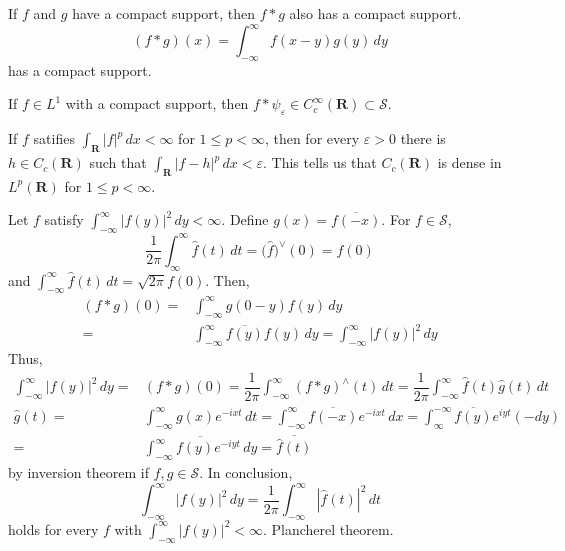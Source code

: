 \vspace{2ex}
\begin{thm}
If $f$ and $g$ have a compact support, then $f\ast g$ also has a compact support.
\[(f\ast g)(x)=\int ^{\infty }_{-\infty }f(x-y)g(y)\,dy\]
has a compact support.
\end{thm}
\vspace{2ex}
\begin{cor}
If $f\in L^{1}$ with a compact support, then $f\ast \psi _{\varepsilon }\in C_{c}^{\infty }({\bm R})\subset \mathcal{S}$. 
\end{cor}
\vspace{2ex}
\begin{recall}
If $f$ satifies $\int _{{\bm R}}|f|^{p}\,dx<\infty $ for $1\leq p<\infty $, then for every $\varepsilon >0$ there is $h\in C_{c}({\bm R})$ such that $\int _{{\bm R}}|f-h|^{p}\,dx<\varepsilon $. This tells us that $C_{c}({\bm R})$ is dense in $L^{p}({\bm R})$ for $1\leq p<\infty $. 
\end{recall}
\vspace{2ex}
\begin{ex}
Let $f$ satisfy $\int ^{\infty }_{-\infty }|f(y)|^2\,dy<\infty $. Define $g(x)=\overline{f(-x)}$. For $f\in \mathcal{S}$,
\[\dfrac{1}{2\pi }\int ^{\infty }_{\infty }\hat{f}(t)\,dt=\Big(\hat{f}\Big)^{\vee}(0)=f(0)\]
and $\int ^{\infty }_{-\infty }\hat{f}(t)\,dt=\sqrt{2\pi }f(0)$. Then,
\[\begin{align*}
(f\ast g)(0)=&\int^{\infty }_{-\infty }g(0-y)f(y)\,dy\\
=&\int ^{\infty }_{-\infty }\overline{f(y)}f(y)\,dy=\int ^{\infty }_{-\infty }|f(y)|^2\,dy
\end{align*}\]
Thus,
\[\begin{align*}
\int ^{\infty }_{-\infty }|f(y)|^2\,dy=&(f\ast g)(0)=\dfrac{1}{2\pi }\int ^{\infty }_{-\infty }(f\ast g)^{\wedge}(t)\,dt
=\dfrac{1}{2\pi }\int ^{\infty }_{-\infty }\hat{f}(t)\hat{g}(t)\,dt\\
\hat{g}(t)=&\int ^{\infty }_{-\infty }g(x)e^{-ixt}\,dt=\int ^{\infty }_{-\infty }\overline{f(-x)}e^{-ixt}\,dx=\int ^{-\infty }_{\infty }\overline{f(y)}e^{iyt}(-dy)\\
=&\overline{\int ^{\infty }_{-\infty }f(y)e^{-iyt}\,dy}=\overline{\hat{f}(t)}
\end{align*}\]
by inversion theorem if $f,g\in \mathcal{S}$. In conclusion, 
\[\int ^{\infty }_{-\infty }|f(y)|^2\,dy=\dfrac{1}{2\pi }\int ^{\infty }_{-\infty }|\hat{f}(t)|^2\,dt\]
holds for every $f$ with $\int ^{\infty }_{-\infty }|f(y)|^2<\infty $. Plancherel theorem. 
\end{ex}
\vspace{2ex}
 
